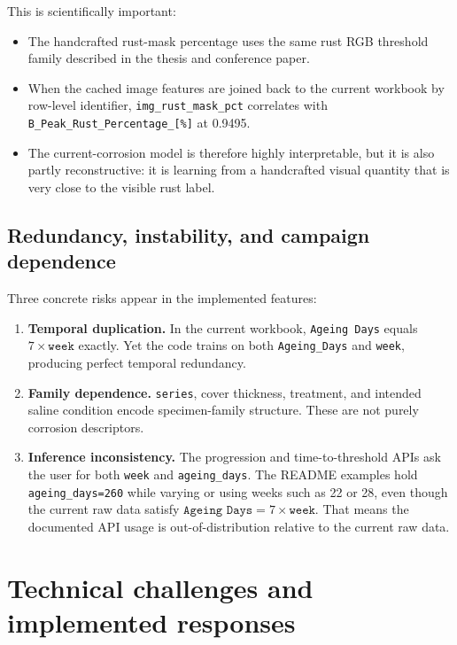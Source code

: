 \documentclass[11pt]{article}
\begin{document}
This is scientifically important:
\begin{itemize}
  \item The handcrafted rust-mask percentage uses the same rust RGB threshold family described in the thesis and conference paper.
  \item When the cached image features are joined back to the current workbook by row-level identifier, \texttt{img\_rust\_mask\_pct} correlates with \texttt{B\_Peak\_Rust\_Percentage\_[\%]} at 0.9495.
  \item The current-corrosion model is therefore highly interpretable, but it is also partly reconstructive: it is learning from a handcrafted visual quantity that is very close to the visible rust label.
\end{itemize}

\subsection{Redundancy, instability, and campaign dependence}
Three concrete risks appear in the implemented features:
\begin{enumerate}
  \item \textbf{Temporal duplication.} In the current workbook, \texttt{Ageing Days} equals \(7 \times \texttt{week}\) exactly. Yet the code trains on both \texttt{Ageing\_Days} and \texttt{week}, producing perfect temporal redundancy.
  \item \textbf{Family dependence.} \texttt{series}, cover thickness, treatment, and intended saline condition encode specimen-family structure. These are not purely corrosion descriptors.
  \item \textbf{Inference inconsistency.} The progression and time-to-threshold APIs ask the user for both \texttt{week} and \texttt{ageing\_days}. The README examples hold \texttt{ageing\_days=260} while varying or using weeks such as 22 or 28, even though the current raw data satisfy \(\texttt{Ageing Days} = 7 \times \texttt{week}\). That means the documented API usage is out-of-distribution relative to the current raw data.
\end{enumerate}

\section{Technical challenges and implemented responses}
\end{document}
